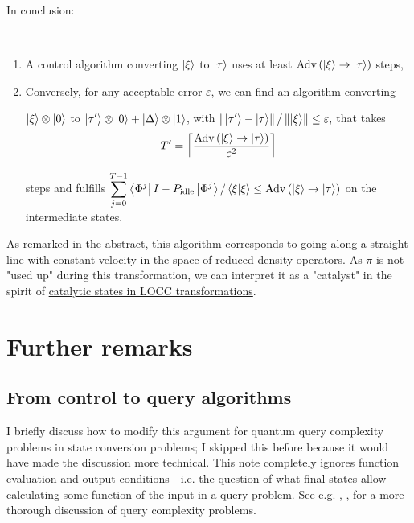 \documentclass{article}
\begin{document}
In conclusion:
\begin{thm}~
\begin{enumerate}
    \item A control algorithm converting $\displaystyle \ket{\xi }$ to $\displaystyle \ket{\tau }$ uses at least $\displaystyle \mathrm{Adv}\left(\ket{\xi }\rightarrow \ket{\tau }\right)$ steps,
    \item Conversely, for any acceptable error $\displaystyle \varepsilon $, we can find an algorithm converting 

		$\displaystyle \ket{\xi } \otimes \ket{0}$ to $\displaystyle \ket{\tau '} \otimes \ket{0} +\ket{\Delta } \otimes \ket{1}$, with $\displaystyle \left\Vert \ket{\tau '} -\ket{\tau }\right\Vert /\left\Vert \ket{\xi }\right\Vert \leq \varepsilon ,$ that takes\begin{equation}
T' =\left\lceil \frac{\mathrm{Adv}\left(\ket{\xi }\rightarrow \ket{\tau} \right)}{\varepsilon ^{2}}\right\rceil 
\end{equation}

steps and fulfills $\displaystyle \sum _{j=0}^{T-1}\bra{\Phi ^{j}} I-P_{\mathrm{idle}}\ket{\Phi ^{j}} /\bra{\xi }\ket{\xi } \leq \mathrm{Adv}\left(\ket{\xi }\rightarrow \ket{\tau }\right)$ on the intermediate states.
\end{enumerate}
\end{thm}


As remarked in the abstract, this algorithm corresponds to going along a straight line with constant velocity in the space of reduced density operators. As $\displaystyle \overline{\pi }$ is not "used up" during this transformation, we can interpret it as a "catalyst" in the spirit of \href{https://en.wikipedia.org/wiki/Quantum\_catalyst}{catalytic states in LOCC transformations}.


\section{Further remarks}
\subsection{From control to query algorithms}\label{sec:control-to-query}

I briefly discuss how to modify this argument for quantum query complexity problems in state conversion problems; I skipped this before because it would have made the discussion more technical. This note completely ignores function evaluation and output conditions - i.e. the question of what final states allow calculating some function of the input in a query problem. See e.g. \cite{LasVegas}, \cite{belovs2015variations}, \cite{Barnum2007Semidefinite} for a more thorough discussion of query complexity problems.
\end{document}
